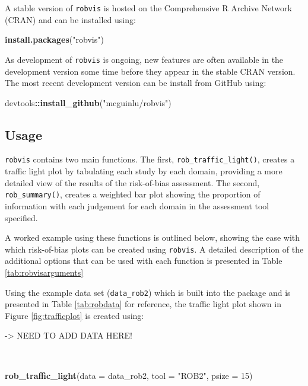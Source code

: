 \documentclass[a4paper, nobind]{templates/ociamthesis}
\newenvironment{Shaded}{\begin{snugshade}}{\end{snugshade}}
\newcommand{\DataTypeTok}[1]{\textcolor[rgb]{0.13,0.29,0.53}{#1}}
\newcommand{\DecValTok}[1]{\textcolor[rgb]{0.00,0.00,0.81}{#1}}
\newcommand{\KeywordTok}[1]{\textcolor[rgb]{0.13,0.29,0.53}{\textbf{#1}}}
\newcommand{\NormalTok}[1]{#1}
\newcommand{\OperatorTok}[1]{\textcolor[rgb]{0.81,0.36,0.00}{\textbf{#1}}}
\newcommand{\StringTok}[1]{\textcolor[rgb]{0.31,0.60,0.02}{#1}}
\renewenvironment{Shaded}
{
  \vspace{4pt}%
  \begin{snugshade}%
}{%
  \end{snugshade}%
  \vspace{4pt}%
}
\begin{document}
A stable version of \texttt{robvis} is hosted on the Comprehensive R Archive Network (CRAN) and can be installed using:

\begin{Shaded}
\begin{Highlighting}[]
\KeywordTok{install.packages}\NormalTok{(}\StringTok{"robvis"}\NormalTok{)}
\end{Highlighting}
\end{Shaded}

As development of \texttt{robvis} is ongoing, new features are often available in the development version some time before they appear in the stable CRAN version. The most recent development version can be install from GitHub using:

\begin{Shaded}
\begin{Highlighting}[]
\NormalTok{devtools}\OperatorTok{::}\KeywordTok{install_github}\NormalTok{(}\StringTok{"mcguinlu/robvis"}\NormalTok{)}
\end{Highlighting}
\end{Shaded}

\hypertarget{usage}{%
\subsection{Usage}\label{usage}}

\texttt{robvis} contains two main functions. The first, \texttt{rob\_traffic\_light()}, creates a traffic light plot by tabulating each study by each domain, providing a more detailed view of the results of the risk-of-bias assessment. The second, \texttt{rob\_summary()}, creates a weighted bar plot showing the proportion of information with each judgement for each domain in the assessment tool specified.

A worked example using these functions is outlined below, showing the ease with which risk-of-bias plots can be created using \texttt{robvis}. A detailed description of the additional options that can be used with each function is presented in Table \ref{tab:robvisarguments}

Using the example data set (\texttt{data\_rob2}) which is built into the package and is presented in Table \ref{tab:robdata} for reference, the traffic light plot shown in Figure \ref{fig:trafficplot} is created using:

-\textgreater{} NEED TO ADD DATA HERE!

~

\begin{Shaded}
\begin{Highlighting}[]
\KeywordTok{rob_traffic_light}\NormalTok{(}\DataTypeTok{data =}\NormalTok{ data_rob2,}
                  \DataTypeTok{tool =} \StringTok{"ROB2"}\NormalTok{,}
                  \DataTypeTok{psize =} \DecValTok{15}\NormalTok{)}
\end{Highlighting}
\end{Shaded}
\end{document}
